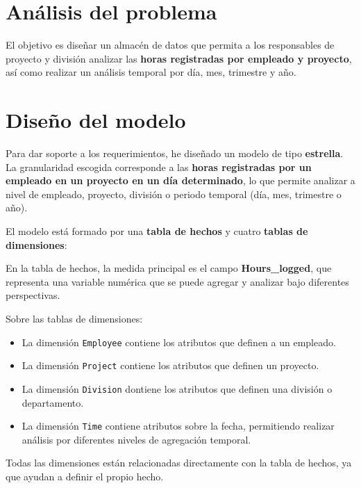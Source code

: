 \documentclass{../../../miPlantilla}
\begin{document}
\maketitle

\section{Análisis del problema}
El objetivo es diseñar un almacén de datos que permita a los responsables de proyecto
y división analizar las \textbf{horas registradas por empleado y proyecto}, así como
realizar un análisis temporal por día, mes, trimestre y año.


\newpage

\section{Diseño del modelo}
Para dar soporte a los requerimientos, he diseñado un modelo de tipo \textbf{estrella}.
La granularidad escogida corresponde a las \textbf{horas registradas por un empleado
en un proyecto en un día determinado}, lo que permite analizar a nivel de empleado,
proyecto, división o periodo temporal (día, mes, trimestre o año).

El modelo está formado por una \textbf{tabla de hechos} y cuatro \textbf{tablas de dimensiones}:

En la tabla de hechos, la medida principal es el campo \textbf{Hours\_logged}, que representa una variable numérica
que se puede agregar y analizar bajo diferentes perspectivas.

Sobre las tablas de dimensiones:

\begin{itemize}
  \item La dimensión \texttt{Employee} contiene los atributos que definen a un empleado.
  \item La dimensión \texttt{Project} contiene los atributos que definen un proyecto.
  \item La dimensión \texttt{Division} dontiene los atributos que definen una división o departamento.
  \item La dimensión \texttt{Time} contiene atributos sobre la fecha, permitiendo realizar análisis por diferentes niveles de agregación temporal.
\end{itemize}

Todas las dimensiones están relacionadas directamente con la tabla de hechos, ya que ayudan a definir
el propio hecho.
\end{document}
